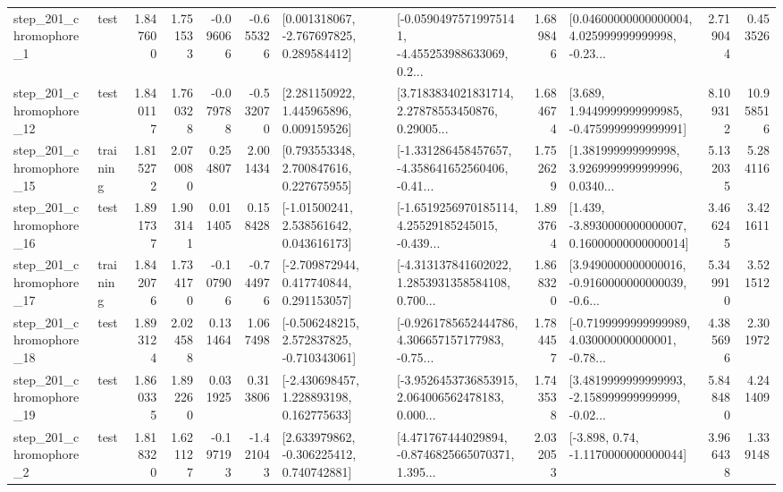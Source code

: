 \begin{tabular}{llrrrrllrlrr}
   step\_201\_chromophore\_1 &      test &      1.847600 &    1.751533 &     -0.096066 & -0.655326 &    [0.001318067, -2.767697825, 0.289584412] &  [-0.05904975719975141, -4.455253988633069, 0.2... &       1.689846 &  [0.04600000000000004, 4.025999999999998, -0.23... &            2.719044 &          0.453526 \\
  step\_201\_chromophore\_12 &      test &      1.840117 &    1.760328 &     -0.079788 & -0.532070 &     [2.281150922, 1.445965896, 0.009159526] &  [3.7183834021831714, 2.27878553450876, 0.29005... &       1.684674 &   [3.689, 1.9449999999999985, -0.4759999999999991] &            8.109312 &         10.958516 \\
  step\_201\_chromophore\_15 &  training &      1.815272 &    2.070080 &      0.254807 &  2.001434 &     [0.793553348, 2.700847616, 0.227675955] &  [-1.331286458457657, -4.358641652560406, -0.41... &       1.752629 &  [1.381999999999998, 3.9269999999999996, 0.0340... &            5.132035 &          5.284116 \\
  step\_201\_chromophore\_16 &      test &      1.891737 &    1.903141 &      0.011405 &  0.158428 &     [-1.01500241, 2.538561642, 0.043616173] &  [-1.6519256970185114, 4.25529185245015, -0.439... &       1.893764 &  [1.439, -3.8930000000000007, 0.16000000000000014] &            3.466245 &          3.421611 \\
  step\_201\_chromophore\_17 &  training &      1.842076 &    1.734170 &     -0.107906 & -0.744976 &    [-2.709872944, 0.417740844, 0.291153057] &  [-4.313137841602022, 1.2853931358584108, 0.700... &       1.868320 &  [3.9490000000000016, -0.9160000000000039, -0.6... &            5.349910 &          3.521512 \\
  step\_201\_chromophore\_18 &      test &      1.893124 &    2.024588 &      0.131464 &  1.067498 &   [-0.506248215, 2.572837825, -0.710343061] &  [-0.9261785652444786, 4.306657157177983, -0.75... &       1.784457 &  [-0.7199999999999989, 4.030000000000001, -0.78... &            4.385696 &          2.301972 \\
  step\_201\_chromophore\_19 &      test &      1.860335 &    1.892260 &      0.031925 &  0.313806 &    [-2.430698457, 1.228893198, 0.162775633] &  [-3.9526453736853915, 2.064006562478183, 0.000... &       1.743538 &  [3.4819999999999993, -2.158999999999999, -0.02... &            5.848480 &          4.241409 \\
   step\_201\_chromophore\_2 &      test &      1.818320 &    1.621127 &     -0.197193 & -1.421043 &    [2.633979862, -0.306225412, 0.740742881] &  [4.471767444029894, -0.8746825665070371, 1.395... &       2.032053 &                [-3.898, 0.74, -1.1170000000000044] &            3.966438 &          1.339148 \\

\end{tabular}
